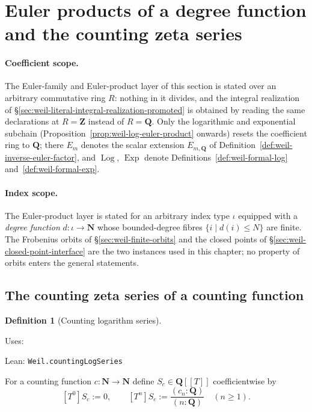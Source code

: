 \documentclass[11pt]{report}
\newcommand{\lean}[1]{%
  \par\smallskip\noindent\textcolor{blue!55!black}{\textsf{Lean:} }%
  \footnotesize\sloppy\nolinkurl{#1}\par}
\newcommand{\uses}[1]{%
  \par\smallskip\noindent\textcolor{purple!60!black}{\textsf{Uses:} }%
  \footnotesize\sloppy\auditdependencylist{#1}\par}
\theoremstyle{definition}
\newtheorem{definition}{Definition}[section]
\theoremstyle{plain}
\theoremstyle{remark}
\begin{document}
\section{Euler products of a degree function and the counting zeta series}
\label{sec:weil-orbit-euler-product}

\paragraph{Coefficient scope.}
The Euler-family and Euler-product layer of this section is stated over an
arbitrary commutative ring $R$: nothing in it divides, and the integral
realization of \S\ref{sec:weil-literal-integral-realization-promoted} is
obtained by reading the same declarations at $R=\mathbf Z$ instead of
$R=\mathbf Q$.  Only the logarithmic and exponential subchain
(Proposition~\ref{prop:weil-log-euler-product} onwards) resets the
coefficient ring to $\mathbf Q$; there $E_m$ denotes the scalar extension
$E_{m,\mathbf Q}$ of Definition~\ref{def:weil-inverse-euler-factor}, and
$\operatorname{Log}$, $\operatorname{Exp}$ denote
Definitions~\ref{def:weil-formal-log} and~\ref{def:weil-formal-exp}.

\paragraph{Index scope.}
The Euler-product layer is stated for an arbitrary index type $\iota$
equipped with a \emph{degree function} $d:\iota\to\mathbf N$ whose
bounded-degree fibres $\{i\mid d(i)\leq N\}$ are finite.  The Frobenius
orbits of \S\ref{sec:weil-finite-orbits} and the closed points of
\S\ref{sec:weil-closed-point-interface} are the two instances used in this
chapter; no property of orbits enters the general statements.

\subsection*{The counting zeta series of a counting function}

\begin{definition}[Counting logarithm series]
  \label{def:weil-counting-log-series}
  \uses{}
  \lean{Weil.countingLogSeries}

  For a counting function $c:\mathbf N\to\mathbf N$ define
  $S_c\in\mathbf Q[[T]]$ coefficientwise by
  \[
    [T^0]S_c:=0,\qquad
    [T^n]S_c:=\frac{(c_n:\mathbf Q)}{(n:\mathbf Q)}\quad(n\geq1).
  \]
\end{definition}
\end{document}
